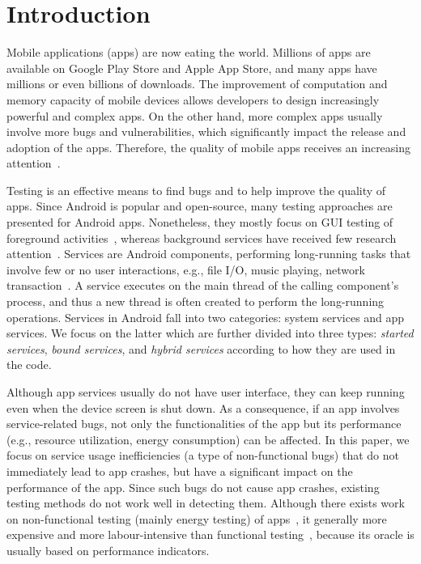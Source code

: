 \documentclass[conference]{IEEEtran}
\begin{document}
\IEEEdisplaynontitleabstractindextext
\IEEEpeerreviewmaketitle



\section{Introduction}
Mobile applications (apps) are now eating the world. Millions of apps are available on Google Play Store and Apple App Store, and many apps have millions or even billions of downloads. The improvement of computation and memory capacity of mobile devices allows developers to design increasingly powerful and complex apps. On the other hand, more complex apps usually involve more bugs and vulnerabilities, which significantly impact the release and adoption of the apps. Therefore, the quality of mobile apps receives an increasing attention~\cite{ReavesBGABCDHKS16,AnandNHY12,MachiryTN13,ChoiNS13,LiuXC14,BanerjeeC0R14,LiuXCL14,HechtBRMD15,BehrouzSBM16,MirzaeiGBSM16,SuMCWYYPLS17,FanSCMLXPS18}.

Testing is an effective means to find bugs and to help improve the quality of apps. Since Android is popular and open-source, many testing approaches are presented for Android apps. Nonetheless, they mostly focus on GUI testing of foreground activities~\cite{monkey,AnandNHY12,MachiryTN13,ChoiNS13,MirzaeiGBSM16,BaekB16,SuMCWYYPLS17,SongQH17},
whereas background services have received few research
attention~\cite{ZhangLLC17,ma2018}. Services are Android components, performing long-running tasks that involve few or no user interactions, e.g., file I/O, music playing, network transaction~\cite{Androidservice}. A service executes on the main thread of the calling component's process, and thus a new thread is often created to perform the long-running operations. Services in Android fall into two  categories: system services and app services. We focus on the
latter which are further divided into three types: \textit{started services}, \textit{bound services}, and \textit{hybrid services} according to how they are used in the code.

Although app services usually do not have user interface, they can keep running
even when the device screen is shut down. As a consequence, if an app involves
service-related bugs, not only the functionalities of the app but its
performance (e.g., resource utilization, energy consumption) can be affected.
In this paper, we focus on service usage inefficiencies (a type of
non-functional bugs) that do not immediately lead to app crashes, but
have a significant impact on the performance of the app.
Since such bugs do not cause app crashes, existing testing methods do
not work well in detecting them. Although there exists work on non-functional
testing (mainly energy testing) of apps~\cite{LiuXC14,BanerjeeC0R14,LiuXCL14,BehrouzSBM16,JabbarvandM17}, it generally more expensive and more labour-intensive than functional testing~\cite{BehrouzSBM16}, because its oracle is usually based on performance indicators.
\end{document}
